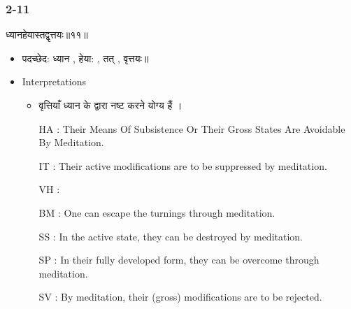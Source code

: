 \begin{frame}[fragile]\frametitle{2-11}
\begin{sanskrit}
ध्यानहेयास्तद्वृत्तयः॥११॥
\end{sanskrit}

	\begin{itemize}
	\item पदच्छेद: ध्यान , हेया: , तत् , वृत्तयः॥
	\item Interpretations
		\begin{itemize}
		\item वृत्तियाँ ध्यान के द्वारा नष्ट करने योग्य हैं ।
		\item [HA]: Their Means Of Subsistence Or Their Gross States Are Avoidable By Meditation.
		\item [IT]: Their active modifications are to be suppressed by meditation.
		\item [VH]: 
		\item [BM]: One can escape the turnings through meditation.
		\item [SS]: In the active state, they can be destroyed by meditation.
		\item [SP]: In their fully developed form, they can be overcome through meditation.
		\item [SV]: By meditation, their (gross) modifications are to be rejected. 
		\end{itemize}
	\end{itemize}
	
\end{frame}


